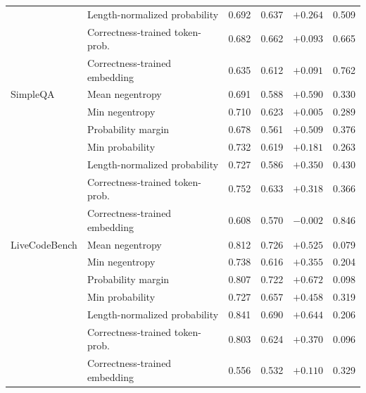 \begin{longtable}{llrrrr}
 & Length-normalized probability & 0.692 & 0.637 & $+0.264$ & 0.509 \\
 & Correctness-trained token-prob. &0.682 & 0.662 & $+0.093$ & 0.665 \\
 & Correctness-trained embedding &0.635 & 0.612 & $+0.091$ & 0.762 \\
SimpleQA & Mean negentropy & 0.691 & 0.588 & $+0.590$ & 0.330 \\
 & Min negentropy & 0.710 & 0.623 & $+0.005$ & 0.289 \\
 & Probability margin & 0.678 & 0.561 & $+0.509$ & 0.376 \\
 & Min probability & 0.732 & 0.619 & $+0.181$ & 0.263 \\
 & Length-normalized probability & 0.727 & 0.586 & $+0.350$ & 0.430 \\
 & Correctness-trained token-prob. &0.752 & 0.633 & $+0.318$ & 0.366 \\
 & Correctness-trained embedding &0.608 & 0.570 & $-0.002$ & 0.846 \\
LiveCodeBench & Mean negentropy & 0.812 & 0.726 & $+0.525$ & 0.079 \\
 & Min negentropy & 0.738 & 0.616 & $+0.355$ & 0.204 \\
 & Probability margin & 0.807 & 0.722 & $+0.672$ & 0.098 \\
 & Min probability & 0.727 & 0.657 & $+0.458$ & 0.319 \\
 & Length-normalized probability & 0.841 & 0.690 & $+0.644$ & 0.206 \\
 & Correctness-trained token-prob. &0.803 & 0.624 & $+0.370$ & 0.096 \\
 & Correctness-trained embedding &0.556 & 0.532 & $+0.110$ & 0.329 \\
\end{longtable}
\endgroup

